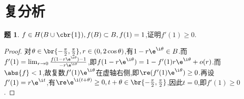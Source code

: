 \documentclass{article}
\theoremstyle{definition}
\newtheorem{exercise}{题}[section]
\begin{document}
\section{复分析}
\begin{exercise}
    $f\in H(B\cup \cbr{1}),f(B)\subset B ,f(1)=1$,证明$f'(1)\geq 0$.
\end{exercise}
\begin{proof}
    对$\theta\in \br{-\frac{\pi}{2},\frac{\pi}{2}}, r\in (0,2\cos \theta)$,有$1-r\e^{\i\theta}\in B$.而$f'(1)=\lim_{r\to 0}\frac{f(1-r\e^{\i\theta})-1}{-r\e^{\i\theta}}$,即$f(1-r\e^{\i\theta})=1-f'(1)r\e^{\i\theta}+o(r)$.而$\abs{f}<1$,故复数$f'(1)\e^{\i\theta}$在虚轴右侧,即$\re(f'(1)\e^{\i\theta})\geq 0$.再设$f'(1)=r\e^{\i t}$,有$\re\e^{\i(t+\theta)}\geq 0, t+\theta\in \br{-\frac{\pi}{2},\frac{\pi}{2}}$,因此$t=0$,即$f'(1)\geq 0$.
\end{proof}
\end{document}
